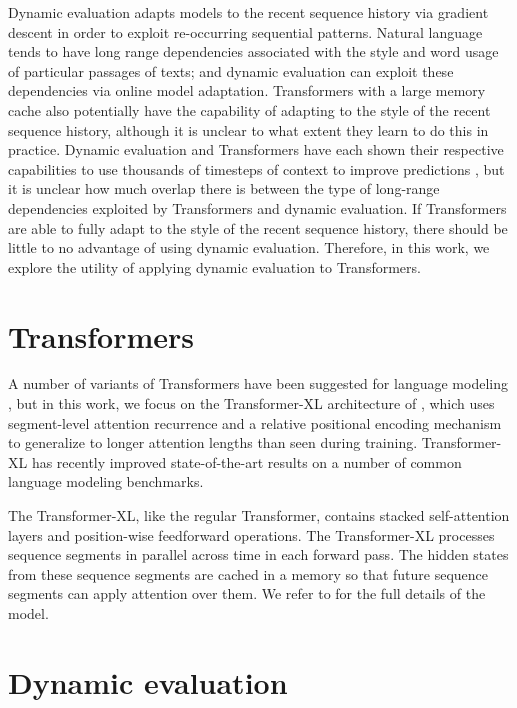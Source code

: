 \documentclass{article} \usepackage{iclr2018_conference,times}
\begin{document}
Dynamic evaluation adapts models to the recent sequence history via gradient descent in order to exploit re-occurring sequential patterns. Natural language tends to have long range dependencies associated with the style and word usage of particular passages of texts; and dynamic evaluation can exploit these dependencies via online model adaptation. Transformers with a large memory cache also potentially have the capability of adapting to the style of the recent sequence history, although it is unclear to what extent they learn to do this in practice. Dynamic evaluation and Transformers have each shown their respective capabilities to use thousands of timesteps of context to improve predictions \citep{krause2018,dai2019}, but it is unclear how much overlap there is between the type of long-range dependencies exploited by Transformers and dynamic evaluation. If Transformers are able to fully adapt to the style of the recent sequence history, there should be little to no advantage of using dynamic evaluation. Therefore, in this work, we explore the utility of applying dynamic evaluation to Transformers.



\section{Transformers}
\label{sec:transformer}

A number of variants of Transformers have been suggested for language modeling \citep{al2018,liu2018,baevski2018,radford2018}, but in this work, we focus on the Transformer-XL architecture of \citet{dai2019}, which uses segment-level attention recurrence and a relative positional encoding mechanism to generalize to longer attention lengths than seen during training. Transformer-XL has recently improved  state-of-the-art results on a number of common language modeling benchmarks.


The Transformer-XL, like the regular Transformer, contains stacked 
self-attention layers and position-wise feedforward operations. The Transformer-XL processes sequence segments in parallel across time in each forward pass. The hidden states from these sequence segments are cached in a memory so that future sequence segments can apply attention over them. We refer to  \citet{dai2019} for the full details of the model.



\section{Dynamic evaluation}
\label{sec:dyneval}
\end{document}
